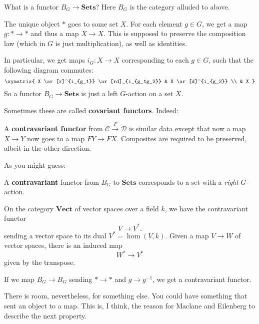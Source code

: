 \begin{example} 
What is a functor $B_G \stackrel{}{\to} \mathbf{Sets}$? Here $B_G$ is the
category alluded to above. 

The unique object $\ast$ goes to some set $X$. For each element $g \in G$, we
get a map $g: \ast \to \ast$ and thus a map $X \to X$. This is supposed to
preserve the composition law (which in $G$ is just multiplication), as well as
identities. 

In particular, we get maps $i_G: X \to X$ corresponding to each $g \in G$, such
that the following diagram commutes:
\[ \xymatrix{
X \ar[r]^{i_{g_1}} \ar[rd]_{i_{g_1g_2}} & X \ar[d]^{i_{g_2}} \\ & X 
}\]
So a functor $B_G \to \mathbf{Sets}$ is just a left $G$-action on a set $X$.
\end{example} 

Sometimes these are called \textbf{covariant functors}. Indeed:

\begin{definition} 
A \textbf{contravariant functor} from $\mathcal{C} \stackrel{F}{\to}\mathcal{D}$ is similar
data except that now a map $X \to Y$ now goes to a map $FY \to FX$. Composites
are required to be preserved, albeit in the other direction. 
\end{definition} 

As you might guess:

\begin{example} 
A \textbf{contravariant} functor from $B_G$ to $\mathbf{Sets}$ corresponds to a
set with a \emph{right} $G$-action. 
\end{example} 

\begin{example} 
On the category $\mathbf{Vect}$ of vector spaces over a field $k$, we have the contravariant
functor
\[ V \to V^{\ast}.  \]
sending a vector space to its dual $V^{\ast} = \hom(V,k)$. 
Given a map $V \to W$ of vector spaces, there is an induced map
\[ W^{\ast} \to V^{\ast}  \]
given by the transpose.
\end{example} 

\begin{example} 
If we map $B_G \to B_G$ sending $\ast \to \ast$ and $g \to g^{-1}$, we get a
contravariant functor. 
\end{example} 

There is room, nevertheless, for something else. You could have something that
sent an object to a map. 
This is, I think, the reason for Maclane and Eilenberg to describe the next
property.

